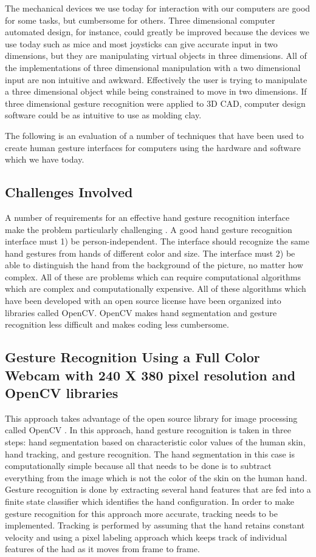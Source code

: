 \documentclass[a4paper,12pt]{report}
\begin{document}
The mechanical devices we use today for interaction with our computers are good for some tasks, but cumbersome for others. Three dimensional computer automated design, for instance, could greatly be improved because the devices we use today such as mice and most joysticks can give accurate input in two dimensions, but they are manipulating virtual objects in three dimensions. All of the implementations of three dimensional manipulation with a two dimensional input are non intuitive and awkward. Effectively the user is trying to manipulate a three dimensional object while being constrained to move in two dimensions. If three dimensional gesture recognition were applied to 3D CAD, computer design software could be as intuitive to use as molding clay. 

The following is an evaluation of a number of techniques that have been used to create human gesture interfaces for computers using the hardware and software which we have today. 

\subsection{Challenges Involved}

A number of requirements for an effective hand gesture recognition interface make the problem particularly challenging \cite{egm}. A good hand gesture recognition interface must 1) be person-independent. The interface should recognize the same hand gestures from hands of different color and size. The interface must 2) be able to distinguish the hand from the background of the picture, no matter how complex. All of these are problems which can require computational algorithms which are complex and computationally expensive. All of these algorithms which have been developed with an open source license have been organized into libraries called OpenCV. OpenCV makes hand segmentation and gesture recognition less difficult and makes coding less cumbersome. 

\subsection{Gesture Recognition Using a Full Color Webcam with 240 X 380 pixel resolution and OpenCV libraries}

This approach takes advantage of the open source library for image processing called OpenCV \cite{opencv}. In this approach, hand gesture recognition is taken in three steps: hand segmentation based on characteristic color values of the human skin, hand tracking, and gesture recognition. The hand segmentation in this case is computationally simple because all that needs to be done is to subtract everything from the image which is not the color of the skin on the human hand. Gesture recognition is done by extracting several hand features that are fed into a finite state classifier which identifies the hand configuration.  In order to make gesture recognition for this approach more accurate, tracking needs to be implemented. Tracking is performed by assuming that the hand retains constant velocity and using a pixel labeling approach which keeps track of individual features of the had as it moves from frame to frame. 
\end{document}
